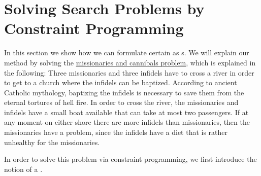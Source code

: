 \section{Solving Search Problems by Constraint Programming}
In this section we show how we can formulate certain  as s.
We will explain our method by solving the
\href{https://en.wikipedia.org/wiki/Missionaries_and_cannibals_problem}{missionaries and cannibals problem},
which is explained in the following:
Three missionaries and three infidels have to cross a river in order to get to a church where the infidels can
be baptized.  According to ancient Catholic mythology, baptizing the infidels is necessary to save them from
the eternal tortures of hell fire. In order to cross the river, the missionaries and infidels have a small boat
available that can take at most two passengers. If at any moment on either shore there are more infidels than
missionaries, then the missionaries have a problem, since the infidels have a diet that is rather unhealthy for
the missionaries. 

In order to solve this problem via constraint programming, we first introduce the notion of a
.

